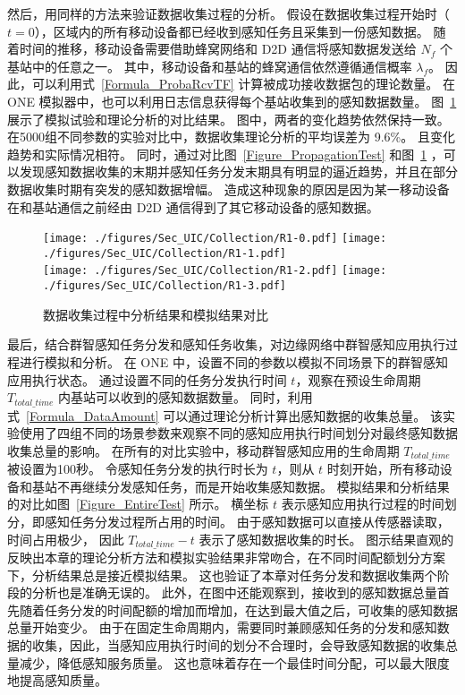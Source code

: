 然后，用同样的方法来验证数据收集过程的分析。
假设在数据收集过程开始时（$t=0$），区域内的所有移动设备都已经收到感知任务且采集到一份感知数据。
随着时间的推移，移动设备需要借助蜂窝网络和 D2D 通信将感知数据发送给 $N_f$ 个基站中的任意之一。
其中，移动设备和基站的蜂窝通信依然遵循通信概率 $\lambda_f$。
因此，可以利用式~\eqref{Formula_ProbaRcvTF} 计算被成功接收数据包的理论数量。
在 ONE 模拟器中，也可以利用日志信息获得每个基站收集到的感知数据数量。
图~\ref{Figure_CollectionTest} 展示了模拟试验和理论分析的对比结果。
图中，两者的变化趋势依然保持一致。
在5000组不同参数的实验对比中，数据收集理论分析的平均误差为 9.6\%。
且变化趋势和实际情况相符。
同时，通过对比图~\ref{Figure_PropagationTest} 和图~\ref{Figure_CollectionTest} ，可以发现感知数据收集的末期并感知任务分发末期具有明显的逼近趋势，并且在部分数据收集时期有突发的感知数据增幅。
造成这种现象的原因是因为某一移动设备在和基站通信之前经由 D2D 通信得到了其它移动设备的感知数据。

\begin{figure}[!h]
  \centering
  {\texttt{[image: ./figures/Sec\_UIC/Collection/R1-0.pdf]}}
  {\texttt{[image: ./figures/Sec\_UIC/Collection/R1-1.pdf]}}\\
  {\texttt{[image: ./figures/Sec\_UIC/Collection/R1-2.pdf]}}
  {\texttt{[image: ./figures/Sec\_UIC/Collection/R1-3.pdf]}}
  \vspace{-0.5em}
  \caption{数据收集过程中分析结果和模拟结果对比}
  \vspace{-0.5em}
  \label{Figure_CollectionTest}
\end{figure}

最后，结合群智感知任务分发和感知任务收集，对边缘网络中群智感知应用执行过程进行模拟和分析。
在 ONE 中，设置不同的参数以模拟不同场景下的群智感知应用执行状态。
通过设置不同的任务分发执行时间 $t$，观察在预设生命周期 $T_{total\_time}$ 内基站可以收到的感知数据数量。
同时，利用式~\eqref{Formula_DataAmount} 可以通过理论分析计算出感知数据的收集总量。
该实验使用了四组不同的场景参数来观察不同的感知应用执行时间划分对最终感知数据收集总量的影响。
在所有的对比实验中，移动群智感知应用的生命周期 $T_{total\_time}$ 被设置为100秒。
令感知任务分发的执行时长为 $t$，则从 $t$ 时刻开始，所有移动设备和基站不再继续分发感知任务，而是开始收集感知数据。
模拟结果和分析结果的对比如图~\ref{Figure_EntireTest} 所示。
横坐标 $t$ 表示感知应用执行过程的时间划分，即感知任务分发过程所占用的时间。
由于感知数据可以直接从传感器读取，时间占用极少，
因此 $T_{total\_time} - t$  表示了感知数据收集的时长。
图示结果直观的反映出本章的理论分析方法和模拟实验结果非常吻合，在不同时间配额划分方案下，分析结果总是接近模拟结果。
这也验证了本章对任务分发和数据收集两个阶段的分析也是准确无误的。
此外，在图中还能观察到，接收到的感知数据总量首先随着任务分发的时间配额的增加而增加，在达到最大值之后，可收集的感知数据总量开始变少。
由于在固定生命周期内，需要同时兼顾感知任务的分发和感知数据的收集，因此，当感知应用执行时间的划分不合理时，会导致感知数据的收集总量减少，降低感知服务质量。
这也意味着存在一个最佳时间分配，可以最大限度地提高感知质量。

